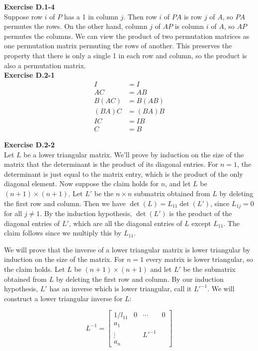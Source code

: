 \documentclass{article}
\begin{document}
\noindent\textbf{Exercise D.1-4}\\

Suppose row $i$ of $P$ has a 1 in column $j$.  Then row $i$ of $PA$ is row $j$ of $A$, so $PA$ permutes the rows.  On the other hand, column $j$ of $AP$ is column $i$ of $A$, so $AP$ permutes the columns.  We can view the product of two permutation matrices as one permutation matrix permuting the rows of another.  This preserves the property that there is only a single 1 in each row and column, so the product is also a permutation matrix. \\

\noindent\textbf{Exercise D.2-1}\\

\begin{align*}
I&=I\\
AC&=AB\\
B(AC)&=B(AB)\\
(BA)C&=(BA)B\\
IC&=IB\\
C&=B
\end{align*}

\noindent\textbf{Exercise D.2-2}\\

Let $L$ be a lower triangular matrix.  We'll prove by induction on the size of the matrix that the determinant is the product of its diagonal entries. For $n=1$, the determinant is just equal to the matrix entry, which is the product of the only diagonal element.  Now suppose the claim holds for $n$, and let $L$ be $(n+1) \times (n+1)$.  Let $L'$ be the $n \times n$ submatrix obtained from $L$ by deleting the first row and column.  Then we have $\det(L) = L_{11} \det(L')$, since $L_{1j} = 0$ for all $j \neq 1$.  By the induction hypothesis, $\det(L')$ is the product of the diagonal entries of $L'$, which are all the diagonal entries of $L$ except $L_{11}$.  The claim follows since we multiply this by $L_{11}$.  

We will prove that the inverse of a lower triangular matrix is lower triangular by induction on the size of the matrix.  For $n=1$ every matrix is lower triangular, so the claim holds.  Let $L$ be $(n+1) \times (n+1)$ and let $L'$ be the submatrix obtained from $L$ by deleting the first row and column.  By our induction hypothesis, $L'$ has an inverse which is lower triangular, call it $L'^{-1}$.  We will construct a lower triangular inverse for $L$:

\[ L^{-1} = \left[ \begin{array}{c|ccc} 1/l_{11}& 0&\cdots&0 \\ \hline a_1 &&&\\ \vdots&&L'^{-1}& \\ a_n & && \end{array}\right] \]
\end{document}
